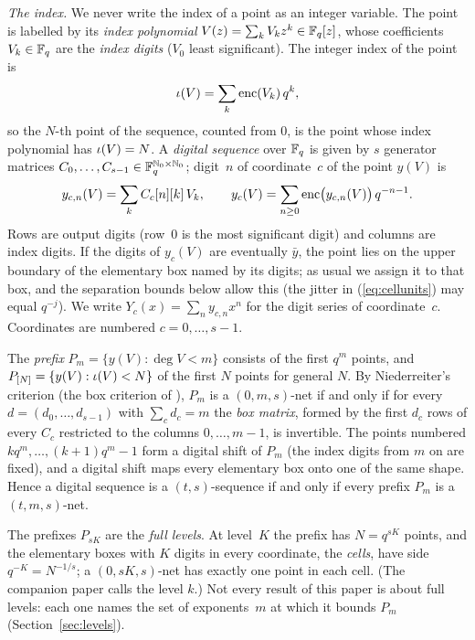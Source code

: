 \emph{The index.} We never write the index of a point as an integer variable. The point is labelled by its \emph{index polynomial} $V(z)=\sum_kV_kz^k\in\mathbb{F}_q[z]$, whose coefficients $V_k\in\mathbb{F}_q$ are the \emph{index digits} ($V_0$ least significant). The integer index of the point is
\[
\iota(V)=\sum_k\operatorname{enc}(V_k)\,q^k,
\]
so the $N$-th point of the sequence, counted from $0$, is the point whose index polynomial has $\iota(V)=N$. A \emph{digital sequence} over $\mathbb{F}_q$ is given by $s$ generator matrices $C_0,\dots,C_{s-1}\in\mathbb{F}_q^{\mathbb{N}_0\times\mathbb{N}_0}$; digit~$n$ of coordinate~$c$ of the point $y(V)$ is
\[
y_{c,n}(V)=\sum_kC_c[n][k]\,V_k,\qquad y_c(V)=\sum_{n\ge0}\operatorname{enc}\bigl(y_{c,n}(V)\bigr)\,q^{-n-1}.
\]
Rows are output digits (row~$0$ is the most significant digit) and columns are index digits. If the digits of $y_c(V)$ are eventually $\bar y$, the point lies on the upper boundary of the elementary box named by its digits; as usual \cite[Section~4.1]{Nie92} we assign it to that box, and the separation bounds below allow this (the jitter in (\ref{eq:cellunits}) may equal $q^{-j}$). We write $Y_c(x)=\sum_ny_{c,n}x^n$ for the digit series of coordinate~$c$. Coordinates are numbered $c=0,\dots,s-1$.

The \emph{prefix} $P_m=\{y(V):\deg V<m\}$ consists of the first $q^m$ points, and $P_{[N]}=\{y(V):\iota(V)<N\}$ of the first $N$ points for general $N$. By Niederreiter's criterion \cite[Thm.~6.1]{Nie87} (the box criterion of \cite{Gru26geo}%
), $P_m$ is a $(0,m,s)$-net if and only if for every $d=(d_0,\dots,d_{s-1})$ with $\sum_cd_c=m$ the \emph{box matrix}, formed by the first $d_c$ rows of every $C_c$ restricted to the columns $0,\dots,m-1$, is invertible. The points numbered $kq^m,\dots,(k+1)q^m-1$ form a digital shift of $P_m$ (the index digits from $m$ on are fixed), and a digital shift maps every elementary box onto one of the same shape. Hence a digital sequence is a $(t,s)$-sequence if and only if every prefix $P_m$ is a $(t,m,s)$-net.

The prefixes $P_{sK}$ are the \emph{full levels}. At level~$K$ the prefix has $N=q^{sK}$ points, and the elementary boxes with $K$ digits in every coordinate, the \emph{cells}, have side $q^{-K}=N^{-1/s}$; a $(0,sK,s)$-net has exactly one point in each cell. (The companion paper \cite{Gru26geo} calls the level $k$.) Not every result of this paper is about full levels: each one names the set of exponents~$m$ at which it bounds $P_m$ (Section~\ref{sec:levels}).

